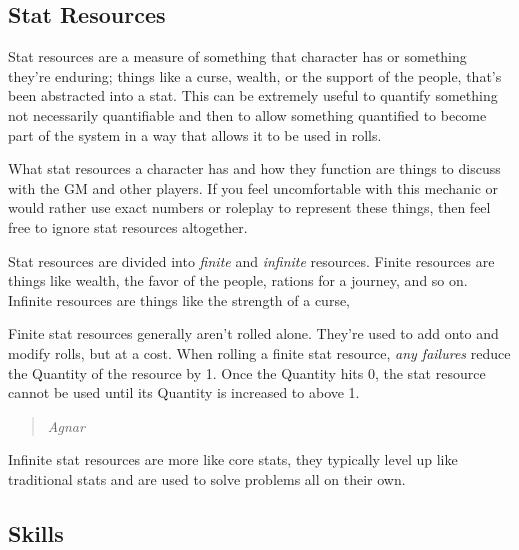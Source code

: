 \documentclass[../main.tex]{subfiles}
\begin{document}
    \subsection{Stat Resources}

        Stat resources are a measure of something that character has or something they're enduring; things like a curse, wealth, or the support of the people, that's been abstracted into a stat. This can be extremely useful to quantify something not necessarily quantifiable and then to allow something quantified to become part of the system in a way that allows it to be used in rolls.
        
        What stat resources a character has and how they function are things to discuss with the GM and other players. If you feel uncomfortable with this mechanic or would rather use exact numbers or roleplay to represent these things, then feel free to ignore stat resources altogether.

        Stat resources are divided into \emph{finite} and \emph{infinite} resources. Finite resources are things like wealth, the favor of the people, rations for a journey, and so on. Infinite resources are things like the strength of a curse, 

        Finite stat resources generally aren't rolled alone. They're used to add onto and modify rolls, but at a cost. When rolling a finite stat resource, \emph{any failures} reduce the Quantity of the resource by 1. Once the Quantity hits 0, the stat resource cannot be used until its Quantity is increased to above 1.

            \begin{quote}
                \emph{Agnar }
            \end{quote}

        Infinite stat resources are more like core stats, they typically level up like traditional stats and are used to solve problems all on their own.

    \subsection{Skills}
\end{document}
